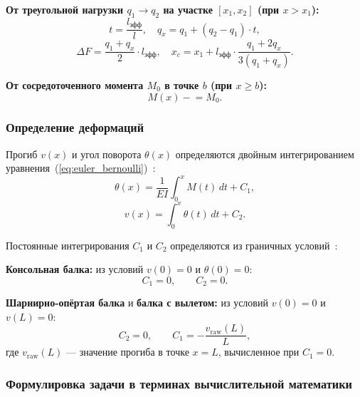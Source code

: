 \textbf{От треугольной нагрузки $q_1 \to q_2$ на участке $[x_1, x_2]$ (при $x > x_1$):}
\begin{equation}
  t = \frac{l_{\text{эфф}}}{l}, \quad q_x = q_1 + (q_2 - q_1) \cdot t,
  \label{eq:section_tri_1}
\end{equation}
\begin{equation}
  \Delta F = \frac{q_1 + q_x}{2} \cdot l_{\text{эфф}}, \quad x_c = x_1 + l_{\text{эфф}} \cdot \frac{q_1 + 2 q_x}{3(q_1 + q_x)}.
  \label{eq:section_tri_2}
\end{equation}

\textbf{От сосредоточенного момента $M_0$ в точке $b$ (при $x \geq b$):}
\begin{equation}
  M(x) \mathrel{-}= M_0.
  \label{eq:section_moment}
\end{equation}

\subsubsection{Определение деформаций}

Прогиб $v(x)$ и угол поворота $\theta(x)$ определяются двойным интегрированием уравнения~(\ref{eq:euler_bernoulli})~\cite{feodosev, popov1998}:
\begin{equation}
  \theta(x) = \frac{1}{EI} \int_0^x M(t) \, dt + C_1,
  \label{eq:theta}
\end{equation}
\begin{equation}
  v(x) = \int_0^x \theta(t) \, dt + C_2.
  \label{eq:deflection}
\end{equation}

Постоянные интегрирования $C_1$ и $C_2$ определяются из граничных условий~\cite{aleksandrov}:

\textbf{Консольная балка:} из условий $v(0) = 0$ и $\theta(0) = 0$:
\begin{equation}
  C_1 = 0, \qquad C_2 = 0.
  \label{eq:const_cant}
\end{equation}

\textbf{Шарнирно-опёртая балка} и \textbf{балка с вылетом:} из условий $v(0) = 0$ и $v(L) = 0$:
\begin{equation}
  C_2 = 0, \qquad C_1 = -\frac{v_{\text{raw}}(L)}{L},
  \label{eq:const_ss}
\end{equation}
где $v_{\text{raw}}(L)$ --- значение прогиба в точке $x = L$, вычисленное при $C_1 = 0$.

\subsubsection{Формулировка задачи в терминах вычислительной математики}

